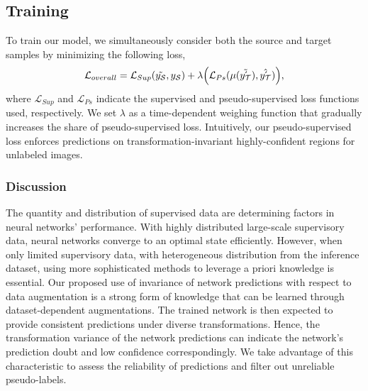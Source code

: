 \subsection{Training}
To train our model, we simultaneously consider both the source and target samples by minimizing the following loss,
\begin{equation}
    \mathcal{L}_{overall} = \mathcal{L}_{Sup}( \tilde{y_\mathcal{S}}, y_\mathcal{S}) + \lambda \Big(\mathcal{L}_{Ps}(\mu (\tilde{\Acute{y_{\mathcal{T}}}}), \hat{\Acute{y_{\mathcal{T}}}})\Big) ,
    \label{eq: loss}
\end{equation}
\noindent
where $\mathcal{L}_{Sup}$ and $\mathcal{L}_{Ps}$ indicate the supervised and pseudo-supervised loss functions used, respectively. We set $\lambda$ as a time-dependent weighing function that gradually increases the share of pseudo-supervised loss. Intuitively, our pseudo-supervised loss enforces predictions on transformation-invariant highly-confident regions for unlabeled images. 

\subsubsection{Discussion} 
The quantity and distribution of supervised data are determining factors in neural networks' performance. With highly distributed large-scale supervisory data, neural networks converge to an optimal state efficiently. However, when only limited supervisory data, with heterogeneous distribution from the inference dataset, using more sophisticated methods to leverage a priori knowledge is essential. Our proposed use of invariance of network predictions with respect to data augmentation is a strong form of knowledge that can be learned through dataset-dependent augmentations. The trained network is then expected to provide consistent predictions under diverse transformations. Hence, the transformation variance of the network predictions can indicate the network's prediction doubt and low confidence correspondingly. We take advantage of this characteristic to assess the reliability of predictions and filter out unreliable pseudo-labels.
